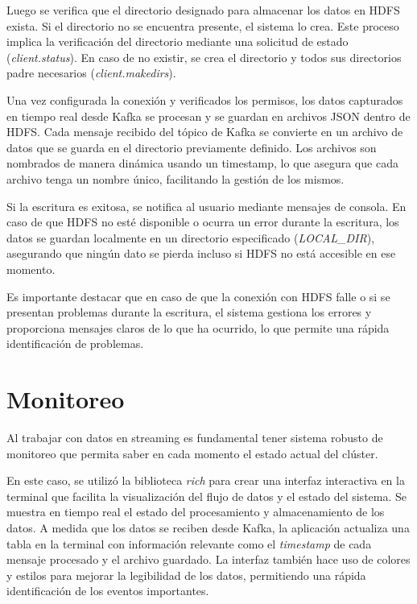 \documentclass{article}
\begin{document}
Luego se verifica que el directorio designado para almacenar los datos en HDFS exista. Si el directorio no se encuentra presente, el sistema lo crea. Este proceso implica la verificación del directorio mediante una solicitud de estado (\textit{client.status}). En caso de no existir, se crea el directorio y todos sus directorios padre necesarios (\textit{client.makedirs}).

Una vez configurada la conexión y verificados los permisos, los datos capturados en tiempo real desde Kafka se procesan y se guardan en archivos JSON dentro de HDFS. Cada mensaje recibido del tópico de Kafka se convierte en un archivo de datos que se guarda en el directorio previamente definido. Los archivos son nombrados de manera dinámica usando un timestamp, lo que asegura que cada archivo tenga un nombre único, facilitando la gestión de los mismos.

Si la escritura es exitosa, se notifica al usuario mediante mensajes de consola. En caso de que HDFS no esté disponible o ocurra un error durante la escritura, los datos se guardan localmente en un directorio especificado (\textit{LOCAL\_DIR}), asegurando que ningún dato se pierda incluso si HDFS no está accesible en ese momento.

Es importante destacar que en caso de que la conexión con HDFS falle o si se presentan problemas durante la escritura, el sistema gestiona los errores y proporciona mensajes claros de lo que ha ocurrido, lo que permite una rápida identificación de problemas.

\section{Monitoreo}

Al trabajar con datos en streaming es fundamental tener sistema robusto de monitoreo que permita saber en cada momento el estado actual del clúster.

En este caso, se utilizó la biblioteca \textit{rich} para crear una interfaz interactiva en la terminal que facilita la visualización del flujo de datos y el estado del sistema.
Se muestra en tiempo real el estado del procesamiento y almacenamiento de los datos. A medida que los datos se reciben desde Kafka, la aplicación actualiza una tabla en la terminal con información relevante como el \textit{timestamp} de cada mensaje procesado y el archivo guardado. La interfaz también hace uso de colores y estilos para mejorar la legibilidad de los datos, permitiendo una rápida identificación de los eventos importantes.
\end{document}
